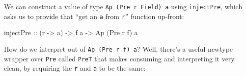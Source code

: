 \documentclass[]{article}
\newenvironment{Shaded}{}{}
\newcommand{\DataTypeTok}[1]{\textcolor[rgb]{0.56,0.13,0.00}{#1}}
\newcommand{\NormalTok}[1]{#1}
\newcommand{\OtherTok}[1]{\textcolor[rgb]{0.00,0.44,0.13}{#1}}
\begin{document}
We can construct a value of type \texttt{Ap\ (Pre\ r\ Field)\ a} using
\texttt{injectPre}, which asks us to provide that ``get an \texttt{a} from
\texttt{r}'' function up-front:

\begin{Shaded}
\begin{Highlighting}[]
\OtherTok{injectPre ::}\NormalTok{ (r }\OtherTok{{-}\textgreater{}}\NormalTok{ a) }\OtherTok{{-}\textgreater{}}\NormalTok{ f a }\OtherTok{{-}\textgreater{}} \DataTypeTok{Ap}\NormalTok{ (}\DataTypeTok{Pre}\NormalTok{ r f) a}
\end{Highlighting}
\end{Shaded}

How do we interpret out of \texttt{Ap\ (Pre\ r\ f)\ a}? Well, there's a useful
newtype wrapper over \texttt{Pre} called \texttt{PreT} that makes consuming and
interpreting it very clean, by requiring the \texttt{r} and \texttt{a} to be the
same:
\end{document}
